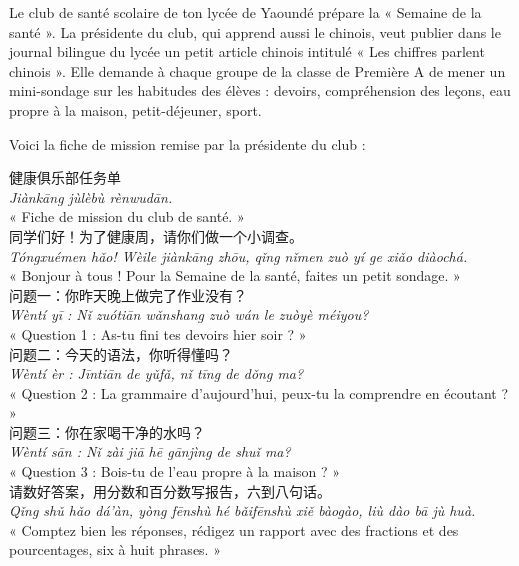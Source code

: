 \documentclass[11pt]{article}
\newcounter{popsec}
\newcounter{popsub}
\newcommand{\courssub}[1]{%
  \stepcounter{popsub}%
  \par\vspace{9pt}\noindent{\popxbold\fontsize{11.5}{13}\selectfont\color{popink}{\color{poporange}\thepopsec.\thepopsub}\hspace{6pt}#1}\par\nopagebreak\vspace{4pt}
}
\begin{document}
\courssub{Situation}

Le club de santé scolaire de ton lycée de Yaoundé prépare la « Semaine de la santé ». La présidente du club, qui apprend aussi le chinois, veut publier dans le journal bilingue du lycée un petit article chinois intitulé « Les chiffres parlent chinois ». Elle demande à chaque groupe de la classe de Première A de mener un mini-sondage sur les habitudes des élèves : devoirs, compréhension des leçons, eau propre à la maison, petit-déjeuner, sport.

Voici la fiche de mission remise par la présidente du club :

\begin{textebox}
健康俱乐部任务单 \\
\emph{Jiànkāng jùlèbù rènwudān.} \\
« Fiche de mission du club de santé. » \\[4pt]
同学们好！为了健康周，请你们做一个小调查。 \\
\emph{Tóngxuémen hǎo! Wèile jiànkāng zhōu, qǐng nǐmen zuò yí ge xiǎo diàochá.} \\
« Bonjour à tous ! Pour la Semaine de la santé, faites un petit sondage. » \\[4pt]
问题一：你昨天晚上做完了作业没有？ \\
\emph{Wèntí yī : Nǐ zuótiān wǎnshang zuò wán le zuòyè méiyou?} \\
« Question 1 : As-tu fini tes devoirs hier soir ? » \\[4pt]
问题二：今天的语法，你听得懂吗？ \\
\emph{Wèntí èr : Jīntiān de yǔfǎ, nǐ tīng de dǒng ma?} \\
« Question 2 : La grammaire d'aujourd'hui, peux-tu la comprendre en écoutant ? » \\[4pt]
问题三：你在家喝干净的水吗？ \\
\emph{Wèntí sān : Nǐ zài jiā hē gānjìng de shuǐ ma?} \\
« Question 3 : Bois-tu de l'eau propre à la maison ? » \\[4pt]
请数好答案，用分数和百分数写报告，六到八句话。 \\
\emph{Qǐng shǔ hǎo dá'àn, yòng fēnshù hé bǎifēnshù xiě bàogào, liù dào bā jù huà.} \\
« Comptez bien les réponses, rédigez un rapport avec des fractions et des pourcentages, six à huit phrases. »
\end{textebox}
\end{document}
